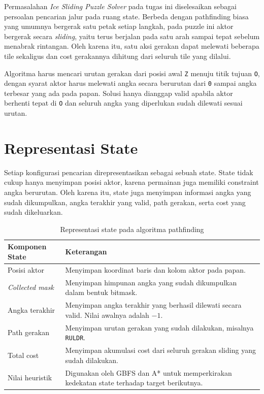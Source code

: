 Permasalahan \textit{Ice Sliding Puzzle Solver} pada tugas ini diselesaikan sebagai persoalan pencarian jalur pada ruang state. 
Berbeda dengan pathfinding biasa yang umumnya bergerak satu petak setiap langkah, pada puzzle ini aktor bergerak secara \textit{sliding}, yaitu terus berjalan pada satu arah sampai tepat sebelum menabrak rintangan. 
Oleh karena itu, satu aksi gerakan dapat melewati beberapa tile sekaligus dan cost gerakannya dihitung dari seluruh tile yang dilalui.

\begin{tcolorbox}[
	colback=blue!5,
	colframe=blue!60!black,
	title=\textbf{Inti Permasalahan Pathfinding},
	arc=2mm,
	boxrule=0.8pt
]
Algoritma harus mencari urutan gerakan dari posisi awal \texttt{Z} menuju titik tujuan \texttt{O}, dengan syarat aktor harus melewati angka secara berurutan dari \texttt{0} sampai angka terbesar yang ada pada papan. 
Solusi hanya dianggap valid apabila aktor berhenti tepat di \texttt{O} dan seluruh angka yang diperlukan sudah dilewati sesuai urutan.
\end{tcolorbox}

\section{Representasi State}

Setiap konfigurasi pencarian direpresentasikan sebagai sebuah state. 
State tidak cukup hanya menyimpan posisi aktor, karena permainan juga memiliki constraint angka berurutan. 
Oleh karena itu, state juga menyimpan informasi angka yang sudah dikumpulkan, angka terakhir yang valid, path gerakan, serta cost yang sudah dikeluarkan.

\begin{table}[H]
	\centering
	\caption{Representasi state pada algoritma pathfinding}
	\begin{tabular}{|p{4cm}|p{10cm}|}
		\hline
		\rowcolor{blue!15}
		\textbf{Komponen State} & \textbf{Keterangan} \\
		\hline
		Posisi aktor & Menyimpan koordinat baris dan kolom aktor pada papan. \\
		\hline
		\textit{Collected mask} & Menyimpan himpunan angka yang sudah dikumpulkan dalam bentuk bitmask. \\
		\hline
		Angka terakhir & Menyimpan angka terakhir yang berhasil dilewati secara valid. Nilai awalnya adalah $-1$. \\
		\hline
		Path gerakan & Menyimpan urutan gerakan yang sudah dilakukan, misalnya \texttt{RULDR}. \\
		\hline
		Total cost & Menyimpan akumulasi cost dari seluruh gerakan sliding yang sudah dilakukan. \\
		\hline
		Nilai heuristik & Digunakan oleh GBFS dan A* untuk memperkirakan kedekatan state terhadap target berikutnya. \\
		\hline
	\end{tabular}
\end{table}

